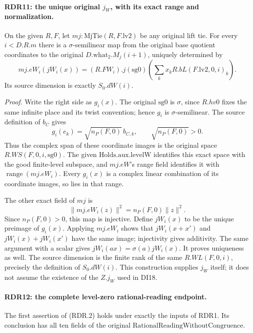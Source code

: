 \paragraph{RDR11: the unique original \(j_W\), with its exact range and normalization.}
\label{claim:RDR11}
On the given \(R,F\), let \(mj:\mathrm{MjTie}(R,F.\mathrm{lv2})\)
be any original lift tie.  For every \(i<D.R.m\) there is a
\(\sigma\)-semilinear map from the original base quotient
coordinates to the original \(D.\mathrm{what}_2.M_j(i+1)\),
uniquely determined by
\[
 mj.eW_i(jW_i(x))
  =(R.FW_i).j(\mathrm{sg0})
                   \left(\sum_k x_k R.bL(F.\mathrm{lv2},0,i)_k\right).
                                                               \tag{RDR.16}
\]
Its source dimension is exactly \(S_0.dW(i)\).

\emph{Proof.}
Write the right side as \(g_i(x)\).  The original
\(\mathrm{sg0}\) is \(\sigma\), since \(R.hv0\) fixes
the same infinite place and its twist convention; hence
\(g_i\) is \(\sigma\)-semilinear.  The source definition
of \(b_C\) gives
\[
 g_i(e_k)=\sqrt{n_P(F,0)}\,b_{C,k},\qquad
       \sqrt{n_P(F,0)}>0.                                  \tag{RDR.17}
\]
Thus the complex span of these coordinate images is the
original space \(R.WS(F,0,i,\mathrm{sg0})\).  The given
\(\mathrm{Holds.aux.levelW}\) identifies this exact space
with the good finite-level subspace, and \(mj.eW\)'s range
field identifies it with \(\operatorname{range}(mj.eW_i)\).
Every \(g_i(x)\) is a complex linear combination of its
coordinate images, so lies in that range.

The other exact field of \(mj\) is
\[
               \|mj.eW_i(z)\|^2=n_P(F,0)\|z\|^2.           \tag{RDR.18}
\]
Since \(n_P(F,0)>0\), this map is injective.  Define
\(jW_i(x)\) to be the unique preimage of \(g_i(x)\).
Applying \(mj.eW_i\) shows that \(jW_i(x+x')\) and
\(jW_i(x)+jW_i(x')\) have the same image; injectivity
gives additivity.  The same argument with a scalar gives
\(jW_i(ax)=\sigma(a)jW_i(x)\).  It proves uniqueness as
well.  The source dimension is the finite rank of the same
\(R.WL(F,0,i)\), precisely the definition of \(S_0.dW(i)\).
This construction supplies \(j_W\) itself; it does not assume
the existence of the \(Z.j_W\) used in DI18.

\paragraph{RDR12: the complete level-zero rational-reading endpoint.}
\label{claim:RDR12}
The first assertion of (RDR.2) holds under exactly the inputs of
RDR1.  Its conclusion has all ten fields of the original
\(\mathrm{RationalReadingWithoutCongruence}\).

